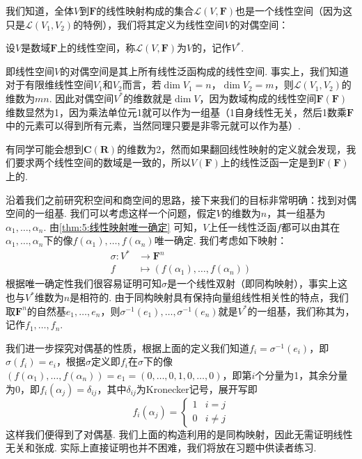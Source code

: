 我们知道，全体$V$到$\mathbf{F}$的线性映射构成的集合$\mathcal{L}(V,\mathbf{F})$也是一个线性空间（因为这只是$\mathcal{L}(V_1,V_2)$的特例），我们将其定义为线性空间$V$的对偶空间：
\begin{definition}[对偶空间] 
    设$V$是数域$\mathbf{F}$上的线性空间，称$\mathcal{L}(V,\mathbf{F})$为$V$的，记作$V^*$.
\end{definition}

即线性空间$V$的对偶空间是其上所有线性泛函构成的线性空间. 事实上，我们知道对于有限维线性空间$V_1$和$V_2$而言，若$\dim V_1=n$，$\dim V_2=m$，则$\mathcal{L}(V_1,V_2)$的维数为$mn$. 因此对偶空间$V^*$的维数就是$\dim V$，因为数域构成的线性空间$\mathbf{F}(\mathbf{F})$维数显然为1，因为乘法单位元1就可以作为一组基（1自身线性无关，然后1数乘$\mathbf{F}$中的元素可以得到所有元素，当然同理只要是非零元就可以作为基）.

有同学可能会想到$\mathbf{C}(\mathbf{R})$的维数为2，然而如果翻回线性映射的定义就会发现，我们要求两个线性空间的数域是一致的，所以$V(\mathbf{F})$上的线性泛函一定是到$\mathbf{F}(\mathbf{F})$上的.

沿着我们之前研究积空间和商空间的思路，接下来我们的目标非常明确：找到对偶空间的一组基. 我们可以考虑这样一个问题，假定$V$的维数为$n$，其一组基为$\alpha_1,\ldots,\alpha_n$. 由\autoref{thm:5:线性映射唯一确定} 可知，$V$上任一线性泛函$f$都可以由其在$\alpha_1,\ldots,\alpha_n$下的像$f(\alpha_1),\ldots,f(\alpha_n)$唯一确定. 我们考虑如下映射：
\begin{align*}
    \sigma:V^* & \to\mathbf{F}^n                         \\
    f          & \mapsto(f(\alpha_1),\ldots,f(\alpha_n))
\end{align*}
根据唯一确定性我们很容易证明可知$\sigma$是一个线性双射（即同构映射），事实上这也与$V^*$维数为$n$是相符的. 由于同构映射具有保持向量组线性相关性的特点，我们取$\mathbf{F}^n$的自然基$e_1,\ldots,e_n$，则$\sigma^{-1}(e_1),\ldots,\sigma^{-1}(e_n)$就是$V^*$的一组基，我们称其为，记作$f_1,\ldots,f_n$.

我们进一步探究对偶基的性质，根据上面的定义我们知道$f_i=\sigma^{-1}(e_i)$，即$\sigma(f_i)=e_i$，根据$\sigma$定义即$f_i$在$\sigma$下的像$(f(\alpha_1),\ldots,f(\alpha_n))=e_1=(0,\ldots,0,1,0,\ldots,0)$，即第$i$个分量为1，其余分量为0，即$f_i(\alpha_j)=\delta_{ij}$，其中$\delta_{ij}$为Kronecker记号，展开写即
\[f_i(\alpha_j)=\begin{cases}
        1 & i=j     \\
        0 & i\neq j
    \end{cases}\]
这样我们便得到了对偶基. 我们上面的构造利用的是同构映射，因此无需证明线性无关和张成. 实际上直接证明也并不困难，我们将放在习题中供读者练习.


